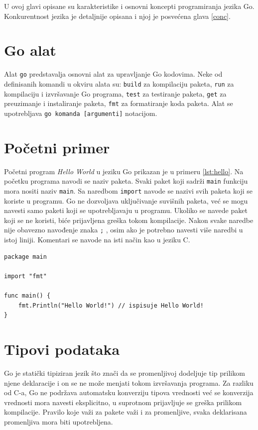 \documentclass[12pt,oneside]{memoir}
\begin{document}
U ovoj glavi opisane su karakteristike i osnovni koncepti programiranja jezika Go.  Konkurentnost jezika je detaljnije opisana i njoj je posvećena glava \ref{conc}.

\section{Go alat}

Alat \texttt{go} predstavalja osnovni alat za upravljanje Go kodovima. Neke od definisanih komandi u okviru alata su: \texttt{build} za kompilaciju paketa, \texttt{run} za kompilaciju i izvršavanje Go programa, \texttt{test} za testiranje paketa, \texttt{get} za preuzimanje i instaliranje paketa, \texttt{fmt} za formatiranje koda paketa. Alat se upotrebljava \texttt{go komanda [argumenti]} notacijom.

\section{Početni primer}

Početni program \textit{Hello World} u jeziku Go prikazan je u primeru \ref{lst:hello}. Na početku programa navodi se naziv paketa. Svaki paket koji sadrži \texttt{main} funkciju mora nositi naziv \texttt{main}. Sa naredbom \texttt{import} navode se nazivi svih paketa koji se koriste u programu. Go ne dozvoljava uključivanje suvišnih paketa, već se mogu navesti samo paketi koji se upotrebljavaju u programu. Ukoliko se navede paket koji se ne koristi, biće prijavljena greška tokom kompilacije. Nakon svake naredbe nije obavezno navođenje znaka \texttt{;} , osim ako je potrebno navesti više naredbi u istoj liniji. Komentari se navode na isti način kao u jeziku C.

\begin{center}
\begin{lstlisting}[caption=Program \textit{Hello World} u jeziku Go,label={lst:hello},  backgroundcolor=\color{background}]
package main

import "fmt"

func main() {
	fmt.Println("Hello World!") // ispisuje Hello World!
}
\end{lstlisting}
\end{center}

\section{Tipovi podataka}

Go je statički tipiziran jezik što znači da se promenljivoj dodeljuje tip prilikom njene deklaracije i on se ne može menjati tokom izvršavanja programa. Za razliku od C-a, Go ne podržava automatsku konverziju tipova vrednosti već se konverzija vrednosti mora navesti eksplicitno, u suprotnom prijavljuje se greška prilikom kompilacije. Pravilo koje važi za pakete važi i za promenljive, svaka deklarisana promenljiva mora biti upotrebljena.
\end{document}
